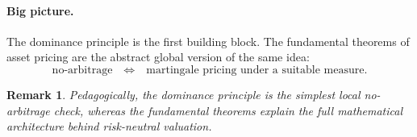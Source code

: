 \documentclass[11pt]{article}
\newcommand{\1}{\mathbf{1}}
\newtheorem{remark}{Remark}
\begin{document}
\paragraph{Big picture.}
The dominance principle is the first building block.
The fundamental theorems of asset pricing are the abstract global version of the same idea:
$$
\text{no-arbitrage}
\quad \Longleftrightarrow \quad
\text{martingale pricing under a suitable measure.}
$$

\begin{remark}
Pedagogically, the dominance principle is the simplest local no-arbitrage check,
whereas the fundamental theorems explain the full mathematical architecture behind risk-neutral valuation.
\end{remark}
\end{document}
